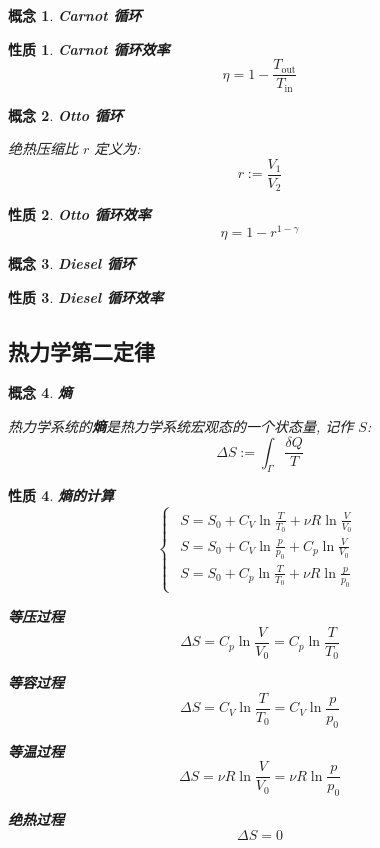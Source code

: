 \documentclass[UTF8]{ctexart}
\newcommand{\<}{\langle}
\renewcommand{\>}{\rangle}                              %
\newenvironment{dfn_box}{
    \begin{tcolorbox}[enhanced, colback=dfn_green2, boxrule=0pt, frame hidden,
        borderline west={0.7mm}{0.1mm}{dfn_green1},breakable]
    }
    {\end{tcolorbox}}
\newenvironment{ppt_box}{
    \begin{tcolorbox}[enhanced, colback=ppt_pink2, boxrule=0pt, frame hidden,
        borderline west={0.7mm}{0.1mm}{ppt_pink1},breakable]
    }
    {\end{tcolorbox}}
\theoremstyle{MyStyle} %
\newtheorem{definition}{概念}[subsection]
\newenvironment{cpt}{\begin{dfn_box}\begin{definition}}{\end{definition}\end{dfn_box}}
\newtheorem{property}{性质}[definition]
\newenvironment{ppt}{\begin{ppt_box}\begin{property}}{\end{property}\end{ppt_box}}
\begin{document}
        \begin{cpt}
            \textbf{Carnot 循环}
        \end{cpt}
        
        \begin{ppt}
            \textbf{Carnot 循环效率}
            \[\eta=1-\frac{T_{\text{out}}}{T_{\text{in}}}\]
        \end{ppt}
        
        \begin{cpt}
            \textbf{Otto 循环}

            绝热压缩比 \(r\) 定义为: 
            \[r:=\frac{V_1}{V_2}\]
        \end{cpt}
        
        \begin{ppt}
            \textbf{Otto 循环效率}
            \[\eta=1-r^{1-\gamma}\]
        \end{ppt}
        
        \begin{cpt}
            \textbf{Diesel 循环}
        \end{cpt}

        \begin{ppt}
            \textbf{Diesel 循环效率}
        \end{ppt}

    \subsection{热力学第二定律}
        
        \begin{cpt}
            \textbf{熵}

            热力学系统的\textbf{熵}是热力学系统宏观态的一个状态量, 记作 \(S\): 
            \[\Delta S:=\int_{\varGamma}\frac{\delta Q}{T}\]
        \end{cpt}
        
        \begin{ppt}
            \textbf{熵的计算}
            \[
            \begin{cases}
            \begin{aligned}
                S = S_0 + C_V\ln\frac{T}{T_0}+\nu R\ln\frac{V}{V_0}\\
                S = S_0 + C_V\ln\frac{p}{p_0}+C_p\ln\frac{V}{V_0}\\
                S = S_0 + C_p\ln\frac{T}{T_0}+\nu R\ln\frac{p}{p_0}
            \end{aligned}
            \end{cases}\]

            \textbf{等压过程}
            \[\Delta S=C_p\ln\frac{V}{V_0}=C_p\ln\frac{T}{T_0}\]

            \textbf{等容过程}
            \[\Delta S=C_V\ln\frac{T}{T_0}=C_V\ln\frac{p}{p_0}\]

            \textbf{等温过程}
            \[\Delta S=\nu R\ln\frac{V}{V_0}=\nu R\ln\frac{p}{p_0}\]

            \textbf{绝热过程}
            \[\Delta S=0\]
        \end{ppt}
        
\end{document}
